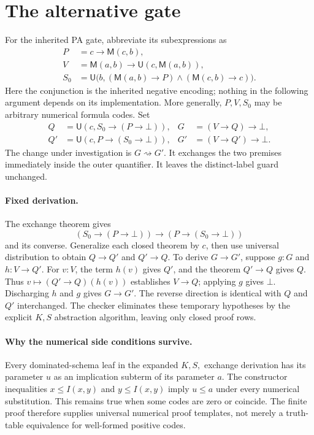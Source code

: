 \documentclass[11pt]{article}
\newcommand{\imp}{\mathbin{\to}}
\newcommand{\U}{\mathsf U}
\newcommand{\M}{\mathsf M}
\begin{document}
\section{The alternative gate}

For the inherited PA gate, abbreviate its subexpressions as
\begin{align*}
 P&=c\imp\M(c,b),\\
 V&=\M(a,b)\imp\U(c,\M(a,b)),\\
 S_0&=\U\bigl(b,
       (\M(a,b)\imp P)\mathbin{\wedge}(\M(c,b)\imp c)\bigr).
\end{align*}
Here the conjunction is the inherited negative encoding; nothing in the
following argument depends on its implementation. More generally,
$P,V,S_0$ may be arbitrary numerical formula codes. Set
\begin{align*}
 Q&=\U(c,S_0\imp(P\imp\bot)),&
 G&=(V\imp Q)\imp\bot,\\
 Q'&=\U(c,P\imp(S_0\imp\bot)),&
 G'&=(V\imp Q')\imp\bot.
\end{align*}
The change under investigation is $G\rightsquigarrow G'$. It exchanges
the two premises immediately inside the outer quantifier. It leaves the
distinct-label guard unchanged.

\paragraph{Fixed derivation.}
The exchange theorem gives
\[
 (S_0\imp(P\imp\bot))\imp(P\imp(S_0\imp\bot))
\]
and its converse. Generalize each closed theorem by $c$, then use universal
distribution to obtain $Q\imp Q'$ and $Q'\imp Q$.
To derive $G\imp G'$, suppose $g:G$ and $h:V\imp Q'$.
For $v:V$, the term $h(v)$ gives $Q'$, and the theorem $Q'\imp Q$ gives
$Q$. Thus $v\mapsto (Q'\imp Q)(h(v))$ establishes $V\imp Q$; applying
$g$ gives $\bot$. Discharging $h$ and $g$ gives $G\imp G'$.
The reverse direction is identical with $Q$ and $Q'$ interchanged.
The checker eliminates these temporary hypotheses by the explicit
$K,S$ abstraction algorithm, leaving only closed proof rows.

\paragraph{Why the numerical side conditions survive.}
Every dominated-schema leaf in the expanded $K,S,$ exchange derivation
has its parameter $u$ as an implication subterm of its parameter $a$.
The constructor inequalities
$x\le I(x,y)$ and $y\le I(x,y)$ imply $u\le a$ under every numerical
substitution. This remains true when some codes are zero or coincide.
The finite proof therefore supplies universal numerical proof templates,
not merely a truth-table equivalence for well-formed positive codes.
\end{document}
